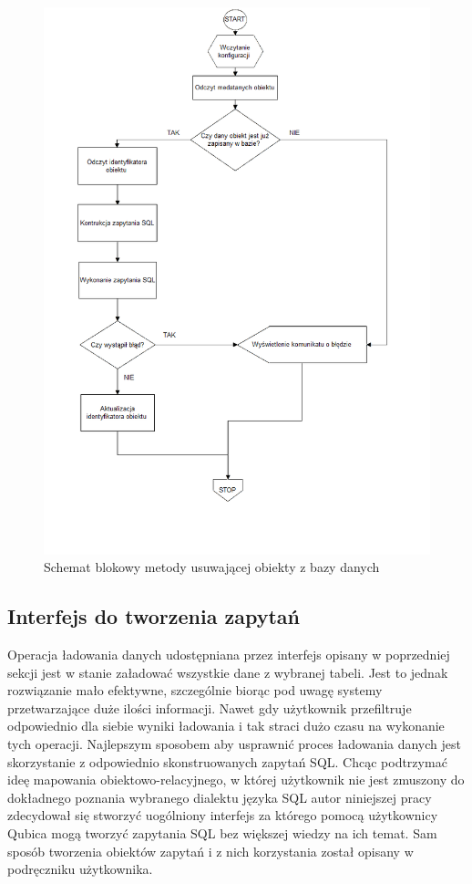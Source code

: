 \documentclass[12pt]{report}
\begin{document}
\begin{figure}[H]
\centering
\includegraphics[width=\textwidth]{resources/remove_schema.png}
\caption{Schemat blokowy metody usuwającej obiekty z bazy danych}
\end{figure}

\newpage

\subsection{Interfejs do tworzenia zapytań}

Operacja ładowania danych udostępniana przez interfejs opisany w poprzedniej sekcji jest w stanie załadować wszystkie dane z wybranej tabeli. Jest to jednak rozwiązanie
mało efektywne, szczególnie biorąc pod uwagę systemy przetwarzające duże ilości informacji. Nawet gdy użytkownik przefiltruje odpowiednio dla siebie wyniki ładowania i tak
straci dużo czasu na wykonanie tych operacji. Najlepszym sposobem aby usprawnić proces ładowania danych jest skorzystanie z odpowiednio skonstruowanych zapytań SQL.
Chcąc podtrzymać ideę mapowania obiektowo-relacyjnego, w której użytkownik nie jest zmuszony do dokładnego poznania wybranego dialektu języka SQL autor niniejszej
pracy zdecydował się stworzyć uogólniony interfejs za którego pomocą użytkownicy Qubica mogą tworzyć zapytania SQL bez większej wiedzy na ich temat. Sam sposób tworzenia
obiektów zapytań i z nich korzystania został opisany w podręczniku użytkownika.
\end{document}
